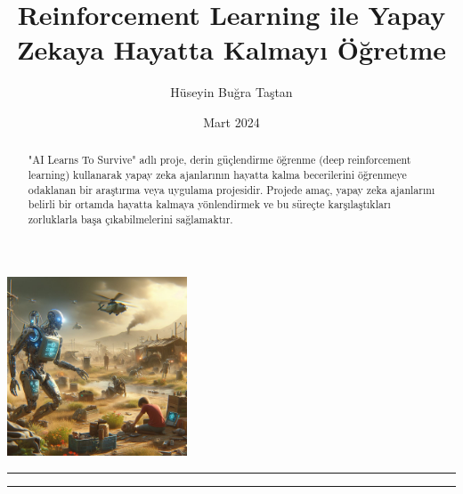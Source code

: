 \documentclass{article}
\title{Reinforcement Learning ile Yapay Zekaya Hayatta Kalmayı Öğretme}
\author{Hüseyin Buğra Taştan}
\date{Mart 2024}
\begin{document}
    \maketitle
    \begin{center}
        \includegraphics[width=0.4\textwidth]{forest.jpg} 
    \end{center}
    \vfill
    \rule{\textwidth}{0.5pt}
    \renewcommand{\abstractname}{Özet}
\begin{abstract}
\noindent "AI Learns To Survive" adlı proje, derin güçlendirme öğrenme (deep reinforcement learning) kullanarak yapay zeka ajanlarının hayatta kalma becerilerini öğrenmeye odaklanan bir araştırma veya uygulama projesidir. Projede amaç, yapay zeka ajanlarını belirli bir ortamda hayatta kalmaya yönlendirmek ve bu süreçte karşılaştıkları zorluklarla başa çıkabilmelerini sağlamaktır.
\end{abstract}
\rule{\textwidth}{0.5pt}
    \vfill

\newpage
\end{document}
